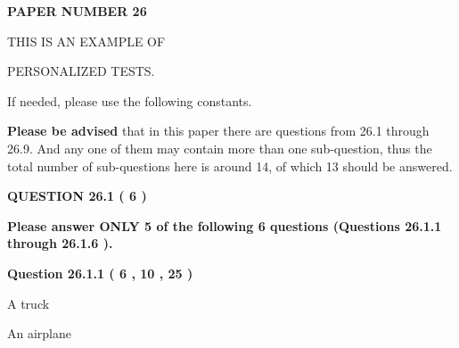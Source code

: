 \documentclass[12pt]{article}
\begin{document}
 
 
   
   
\newpage 
\setcounter{page}{ 
    26001 } 
   
   
   
   
 {\textbf{ \Large{ PAPER NUMBER           26  }}}
   
   
\vspace{0.2in}
   
   
   
   
   
   
 \vspace{0.2in}
 
 
{\Huge  THIS IS AN EXAMPLE OF}
 
{\Huge  PERSONALIZED TESTS. }
 
If needed, please use the following constants.
 
 
 
{\textbf{\large{Please be advised}}} that in this paper there are questions from
26.1 through
26.9.
And any one of them may contain more than one sub-question, thus the total number
of sub-questions here is around 14, of which
13 should be answered.
 
\vspace{0.3in}
 
 
   
   
  
\vspace{0.2in}
  
{\textbf{\Large{QUESTION
26.1 
 (           6 )
}}}
  
  
{\textbf{\Large{Please answer ONLY  %
           5  %
 of the following  %
           6  %
 questions (Questions  %
26.1.1 %
 through  %
26.1.6 %
 ). }}}
   
   
  
\vspace{0.2in}
  
{\textbf{\Large{Question
26.1.1 
 (           6 ,          10 ,          25 )
}}}
  
  
 
 
\noindent{}
 
 
A truck
 
 
An airplane
 
 
 
 
  
\end{document}
